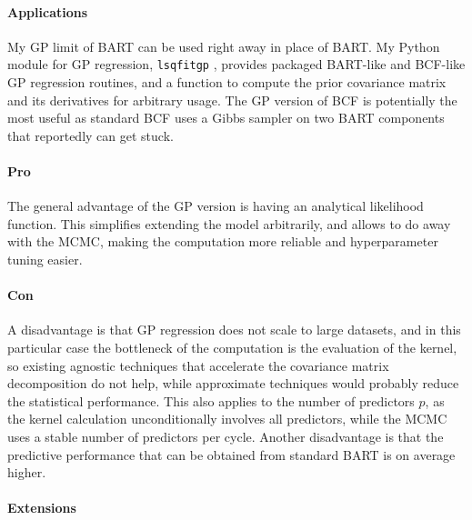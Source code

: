 \documentclass[a4paper]{article}
\theoremstyle{definition}
\let\oldmarginpar\marginpar
\renewcommand{\marginpar}[1]{\oldmarginpar{\sffamily\scriptsize #1}}
\renewcommand{\marginpar}[1]{\relax} %
\begin{document}
    \paragraph{Applications}

    My GP limit of BART can be used right away in place of BART. My Python module for GP regression, \texttt{lsqfitgp} \autocite{petrillo2024c}, provides packaged BART-like and BCF-like GP regression routines, and a function to compute the prior covariance matrix and its derivatives for arbitrary usage. The GP version of BCF is potentially the most useful as standard BCF uses a Gibbs sampler on two BART components that reportedly can get stuck.\marginpar{Ask Linero for a citation on this, although I fear there isn't any.}

    \paragraph{Pro}

    The general advantage of the GP version is having an analytical likelihood function. This simplifies extending the model arbitrarily, and allows to do away with the MCMC, making the computation more reliable and hyperparameter tuning easier.

    \paragraph{Con}

    A disadvantage is that GP regression does not scale to large datasets, and in this particular case the bottleneck of the computation is the evaluation of the kernel, so existing agnostic techniques that accelerate the covariance matrix decomposition do not help, while approximate techniques would probably reduce the statistical performance. This also applies to the number of predictors $p$, as the kernel calculation unconditionally involves all predictors, while the MCMC uses a stable number of predictors per cycle. Another disadvantage is that the predictive performance that can be obtained from standard BART is on average higher.

    \paragraph{Extensions}
\end{document}
